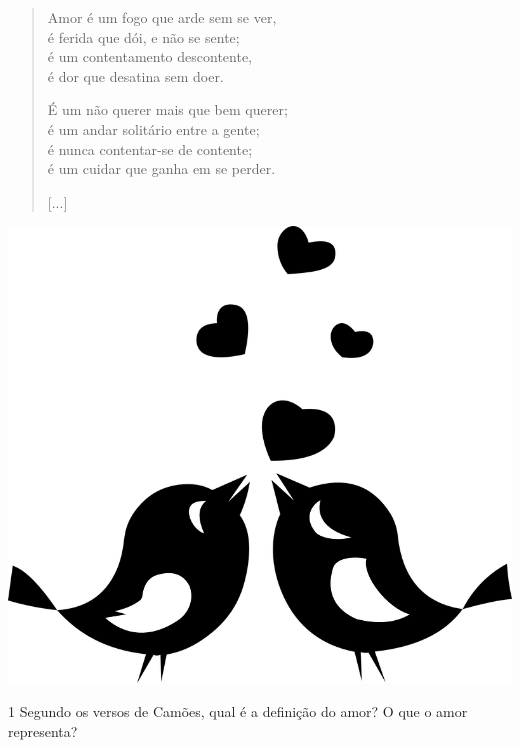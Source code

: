 \begin{minipage}{.6\textwidth}
\begin{verse}
Amor é um fogo que arde sem se ver,\\
é ferida que dói, e não se sente;\\
é um contentamento descontente,\\
é dor que desatina sem doer.

É um não querer mais que bem querer;\\
é um andar solitário entre a gente;\\
é nunca contentar-se de contente;\\
é um cuidar que ganha em se perder.

{[}...{]}
\end{verse}
\end{minipage}
\begin{minipage}{.4\textwidth}
\includegraphics[width=\textwidth]{./_SAEB_9_POR/media/image24.png}
\end{minipage}


\num{1} Segundo os versos de Camões, qual é a definição do amor? O que o
amor representa?


